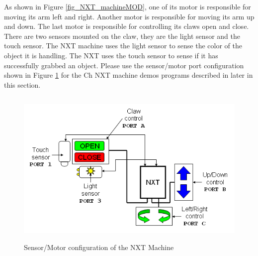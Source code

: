 \documentclass[11pt]{article}
\begin{document}
\noindent
As shown in Figure \ref{fig_NXT_machineMOD}, one of its motor is responsible for moving its arm left and right.
Another motor is responsible for moving its arm up and down.
The last motor is responsible for controlling its claws open and close.
There are two sensors mounted on the claw, they are the light sensor and the touch sensor.
The NXT machine uses the light sensor to sense the color of the object it is handling.
The NXT uses the touch sensor to sense if it has successfully grabbed an object.
Please use the sensor/motor port configuration shown in Figure \ref{fig_NXT_mach_port} for the
    Ch NXT machine demos programs described in later in this section.
\begin{figure}[H]
  \begin{center}
    \includegraphics[height=3in]{figure/mindstorm/NXT_mach_port.png}
    \caption{Sensor/Motor configuration of the NXT Machine\label{fig_NXT_mach_port}}
  \end{center}
\end{figure}
\newpage
\end{document}
